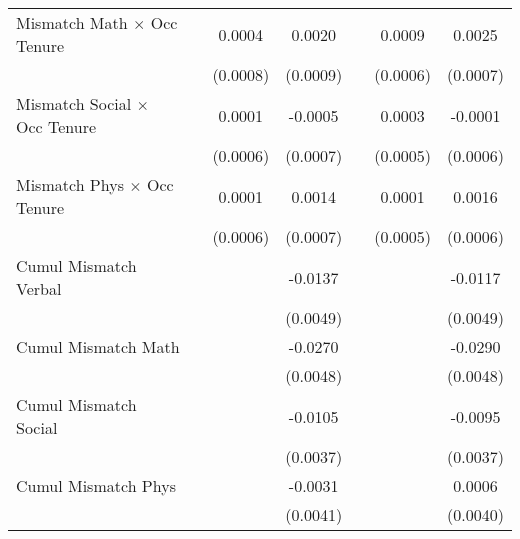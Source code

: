 {\begin{longtable}{l*{6}{c}}
Mismatch Math $\times$ Occ Tenure&                     &      0.0004         &      0.0020\sym{**} &                     &      0.0009         &      0.0025\sym{***}\\
                    &                     &    (0.0008)         &    (0.0009)         &                     &    (0.0006)         &    (0.0007)         \\
Mismatch Social $\times$ Occ Tenure&                     &      0.0001         &     -0.0005         &                     &      0.0003         &     -0.0001         \\
                    &                     &    (0.0006)         &    (0.0007)         &                     &    (0.0005)         &    (0.0006)         \\
Mismatch Phys $\times$ Occ Tenure&                     &      0.0001         &      0.0014\sym{*}  &                     &      0.0001         &      0.0016\sym{***}\\
                    &                     &    (0.0006)         &    (0.0007)         &                     &    (0.0005)         &    (0.0006)         \\
Cumul Mismatch Verbal&                     &                     &     -0.0137\sym{***}&                     &                     &     -0.0117\sym{**} \\
                    &                     &                     &    (0.0049)         &                     &                     &    (0.0049)         \\
Cumul Mismatch Math &                     &                     &     -0.0270\sym{***}&                     &                     &     -0.0290\sym{***}\\
                    &                     &                     &    (0.0048)         &                     &                     &    (0.0048)         \\
Cumul Mismatch Social&                     &                     &     -0.0105\sym{***}&                     &                     &     -0.0095\sym{**} \\
                    &                     &                     &    (0.0037)         &                     &                     &    (0.0037)         \\
Cumul Mismatch Phys &                     &                     &     -0.0031         &                     &                     &      0.0006         \\
                    &                     &                     &    (0.0041)         &                     &                     &    (0.0040)         \\

\end{longtable}}
